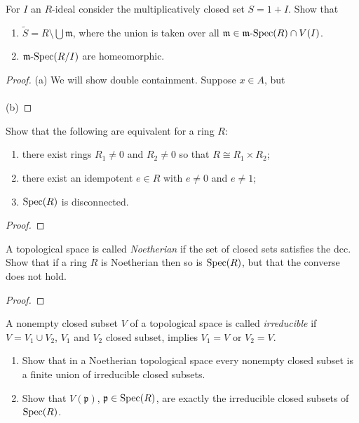 \begin{problem}
For $I$ an $R$-ideal consider the multiplicatively
closed set $S=1+I$. Show that
\begin{enumerate}[noitemsep,label=(\alph*)]
\item $\widetilde S=R\setminus\bigcup\mathfrak{m}$, where the
  union is taken over all
  $\mathfrak{m}\in\text{${\mathfrak{m}}$-$\operatorname{Spec}$}(R)\cap V(I)$.
\item $\text{${\mathfrak{m}}$-$\operatorname{Spec}$}(R/I)$ are homeomorphic.
\end{enumerate}
\end{problem}
\begin{proof}
(a) We will show double containment. Suppose $x\in A$, but
\\\\
(b)
\end{proof}
\newpage
\begin{problem}
Show that the following are equivalent for a ring $R$:
\begin{enumerate}[noitemsep,label=(\alph*)]
\item there exist rings $R_1\neq 0$ and $R_2\neq 0$ so that
  $R\cong R_1\times R_2$;
\item there exist an idempotent $e\in R$ with $e\neq 0$ and
  $e\neq 1$;
\item $\operatorname{Spec}(R)$ is disconnected.
\end{enumerate}
\end{problem}
\begin{proof}
\end{proof}
\newpage
\begin{problem}
A topological space is called \emph{Noetherian} if the set of
closed sets satisfies the dcc. Show that if a ring $R$ is
Noetherian then so is $\operatorname{Spec}(R)$, but that the converse does not
hold.
\end{problem}
\begin{proof}
\end{proof}
\newpage
\begin{problem}
A nonempty closed subset $V$ of a topological space is called
\emph{irreducible} if $V=V_1\cup V_2$, $V_1$ and $V_2$ closed
subset, implies $V_1=V$ or $V_2=V$.
\begin{enumerate}[noitemsep,label=(\alph*)]
\item Show that in a Noetherian topological space every nonempty
  closed subset is a finite union of irreducible closed subsets.
\item Show that $V(\mathfrak{p})$, $\mathfrak{p}\in\operatorname{Spec}(R)$, are
  exactly the irreducible closed subsets of $\operatorname{Spec}(R)$.
\end{enumerate}
\end{problem}
